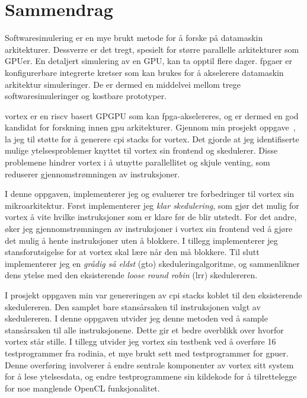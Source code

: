 \chapter*{Sammendrag}

Softwaresimulering er en mye brukt metode for å forske på datamaskin arkitekturer. Dessverre er det tregt, spesielt for større parallelle arkitekturer som GPUer. En detaljert simulering av en GPU, kan ta opptil flere dager. \acrshort{fpga}er er konfigurerbare integrerte kretser som kan brukes for å akselerere datamaskin arkitektur simuleringer. De er dermed en middelvei mellom trege softwaresimuleringer og kostbare prototyper.

\Gls{vortex} er en \Gls{riscv} basert GPGPU som kan \acrshort{fpga}-akselereres, og er dermed en god kandidat for forskning innen \acrshort{gpu} arkitekturer. Gjennom min prosjekt oppgave~\cite{Aurud_Project}, la jeg til støtte for å generere \acrshort{cpi} stacks for \Gls{vortex}. Det gjorde at jeg identifiserte mulige ytelsesproblemer knyttet til \Gls{vortex} sin frontend og skedulerer. Disse problemene hindrer \Gls{vortex} i å utnytte parallellitet og skjule venting, som reduserer gjennomstrømningen av instruksjoner.

I denne oppgaven, implementerer jeg og evaluerer tre forbedringer til \Gls{vortex} sin mikroarkitektur. Først implementerer jeg \textit{klar skedulering}, som gjør det mulig for \Gls{vortex} å vite hvilke instruksjoner som er klare før de blir utstedt. For det andre, øker jeg gjennomstrømningen av instruksjoner i \Gls{vortex} sin frontend ved å gjøre det mulig å hente instruksjoner uten å blokkere. I tillegg implementerer jeg stansforutsigelse for at \Gls{vortex} skal lære når den må blokkere. Til slutt implementerer jeg en \textit{grådig så eldst} (\acrshort{gto}) skeduleringalgoritme, og sammenlikner dens ytelse med den eksisterende \textit{loose round robin} (\acrshort{lrr}) skedulereren.

I prosjekt oppgaven min var genereringen av \acrshort{cpi} stacks koblet til den eksisterende skedulereren. Den samplet bare stansårsaken til instruksjonen valgt av skedulereren. I denne oppgaven utvider jeg denne metoden ved å sample stansårsaken til alle instruksjonene. Dette gir et bedre overblikk over hvorfor \Gls{vortex} står stille. I tillegg utvider jeg \Gls{vortex} sin testbenk ved å overføre 16 testprogrammer fra \Gls{rodinia}, et mye brukt sett med testprogrammer for \acrshort{gpu}er. Denne overføring involverer å endre sentrale komponenter av \Gls{vortex} sitt system for å lese ytelsesdata, og endre testprogrammene sin kildekode for å tilrettelegge for noe manglende OpenCL funksjonalitet.

